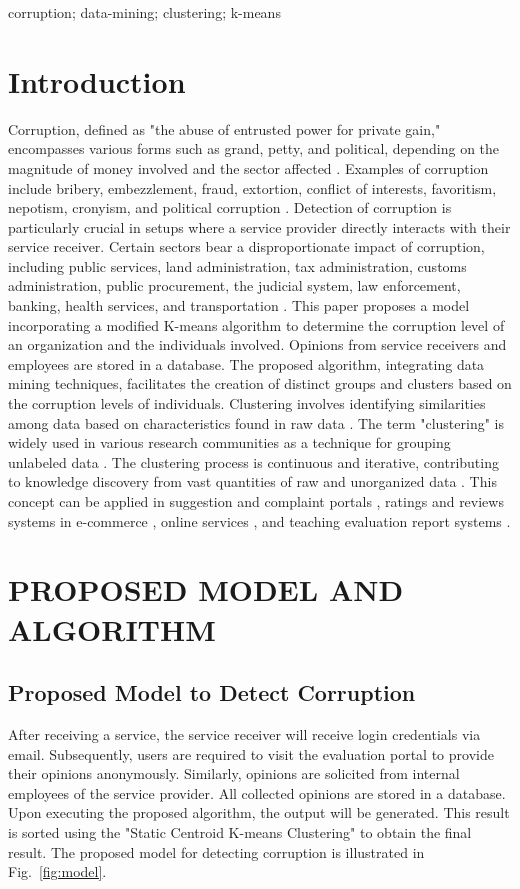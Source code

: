 \documentclass[conference]{IEEEtran}
\begin{document}
\vspace{8pt}

\begin{IEEEkeywords}
    corruption; data-mining; clustering; k-means
\end{IEEEkeywords}

\section{Introduction}
Corruption, defined as "the abuse of entrusted power for private gain," encompasses various forms such as grand, petty, and political, depending on the magnitude of money involved and the sector affected \cite{ref1}. Examples of corruption include bribery, embezzlement, fraud, extortion, conflict of interests, favoritism, nepotism, cronyism, and political corruption \cite{ref2}. Detection of corruption is particularly crucial in setups where a service provider directly interacts with their service receiver. Certain sectors bear a disproportionate impact of corruption, including public services, land administration, tax administration, customs administration, public procurement, the judicial system, law enforcement, banking, health services, and transportation \cite{ref3}. This paper proposes a model incorporating a modified K-means algorithm to determine the corruption level of an organization and the individuals involved. Opinions from service receivers and employees are stored in a database. The proposed algorithm, integrating data mining techniques, facilitates the creation of distinct groups and clusters based on the corruption levels of individuals. Clustering involves identifying similarities among data based on characteristics found in raw data \cite{ref4}. The term "clustering" is widely used in various research communities as a technique for grouping unlabeled data \cite{ref5}. The clustering process is continuous and iterative, contributing to knowledge discovery from vast quantities of raw and unorganized data \cite{ref6}. This concept can be applied in suggestion and complaint portals \cite{ref7}, ratings and reviews systems in e-commerce \cite{ref8}, online services \cite{ref9}, and teaching evaluation report systems \cite{ref10}.

\section{PROPOSED MODEL AND ALGORITHM}
\subsection{Proposed Model to Detect Corruption}
After receiving a service, the service receiver will receive login credentials via email. Subsequently, users are required to visit the evaluation portal to provide their opinions anonymously. Similarly, opinions are solicited from internal employees of the service provider. All collected opinions are stored in a database. Upon executing the proposed algorithm, the output will be generated. This result is sorted using the "Static Centroid K-means Clustering" to obtain the final result. The proposed model for detecting corruption is illustrated in Fig.~\ref{fig:model}.
\end{document}
